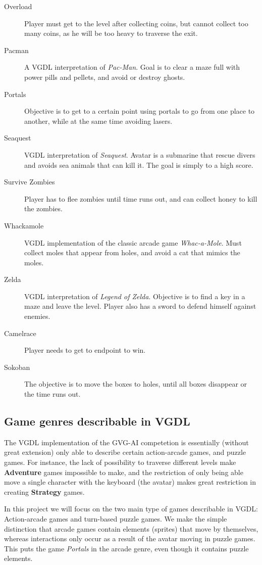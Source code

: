 \documentclass[a4paper,titlepage,final, twoside]{report}
\begin{document}
\begin{description}
\item [Overload] Player must get to the level after collecting coins, but cannot collect too many coins, as he will be too heavy to traverse the exit.
\item [Pacman] A VGDL interpretation of \emph{Pac-Man}. Goal is to clear a maze full with power pills and pellets, and avoid or destroy ghosts.
\item [Portals] Objective is to get to a certain point using portals to go from one place to another, while at the same time avoiding lasers.
\item [Seaquest] VGDL interpretation of \emph{Seaquest}. Avatar is a submarine that rescue divers and avoids sea animals that can kill it. The goal is simply to a high score.
\item [Survive Zombies] Player has to flee zombies until time runs out, and can collect honey to kill the zombies.
\item [Whackamole] VGDL implementation of the classic arcade game \emph{Whac-a-Mole}. Must collect moles that appear from holes, and avoid a cat that mimics the moles.
\item [Zelda] VGDL interpretation of \emph{Legend of Zelda}. Objective is to find a key in a maze and leave the level. Player also has a sword to defend himself against enemies.
\item [Camelrace] Player needs to get to endpoint to win.
\item [Sokoban] The objective is to move the boxes to holes, until all boxes disappear or the time runs out.
\end{description}


\subsection{Game genres describable in VGDL}
The VGDL implementation of the GVG-AI competetion is essentially (without great extension) only able to describe certain action-arcade games, and puzzle games.
For instance, the lack of possibility to traverse different levels make \textbf{Adventure} games impossible to make, and the restriction of only being able move a single character with the keyboard (the avatar) makes great restriction in creating \textbf{Strategy} games.

In this project we will focus on the two main type of games describable in VGDL: Action-arcade games and turn-based puzzle games. We make the simple distinction that arcade games contain elements (sprites) that move by themselves, whereas interactions only occur as a result of the avatar moving in puzzle games.
This puts the game \emph{Portals} in the arcade genre, even though it contains puzzle elements.
\end{document}
